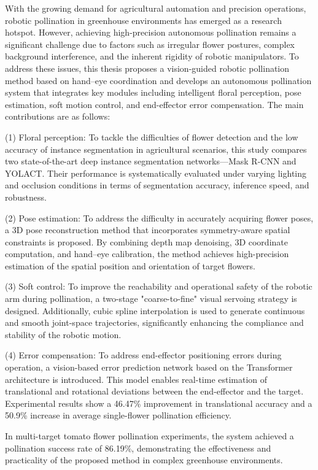 \begin{EnglishAbstract}
With the growing demand for agricultural automation and precision operations, robotic pollination in greenhouse environments has emerged as a research hotspot. However, achieving high-precision autonomous pollination remains a significant challenge due to factors such as irregular flower postures, complex background interference, and the inherent rigidity of robotic manipulators. To address these issues, this thesis proposes a vision-guided robotic pollination method based on hand–eye coordination and develops an autonomous pollination system that integrates key modules including intelligent floral perception, pose estimation, soft motion control, and end-effector error compensation. The main contributions are as follows:

(1) Floral perception: To tackle the difficulties of flower detection and the low accuracy of instance segmentation in agricultural scenarios, this study compares two state-of-the-art deep instance segmentation networks—Mask R-CNN and YOLACT. Their performance is systematically evaluated under varying lighting and occlusion conditions in terms of segmentation accuracy, inference speed, and robustness.

(2) Pose estimation: To address the difficulty in accurately acquiring flower poses, a 3D pose reconstruction method that incorporates symmetry-aware spatial constraints is proposed. By combining depth map denoising, 3D coordinate computation, and hand–eye calibration, the method achieves high-precision estimation of the spatial position and orientation of target flowers.

(3) Soft control: To improve the reachability and operational safety of the robotic arm during pollination, a two-stage "coarse-to-fine" visual servoing strategy is designed. Additionally, cubic spline interpolation is used to generate continuous and smooth joint-space trajectories, significantly enhancing the compliance and stability of the robotic motion.

(4) Error compensation: To address end-effector positioning errors during operation, a vision-based error prediction network based on the Transformer architecture is introduced. This model enables real-time estimation of translational and rotational deviations between the end-effector and the target. Experimental results show a 46.47\% improvement in translational accuracy and a 50.9\% increase in average single-flower pollination efficiency.

In multi-target tomato flower pollination experiments, the system achieved a pollination success rate of 86.19\%, demonstrating the effectiveness and practicality of the proposed method in complex greenhouse environments.

\end{EnglishAbstract}